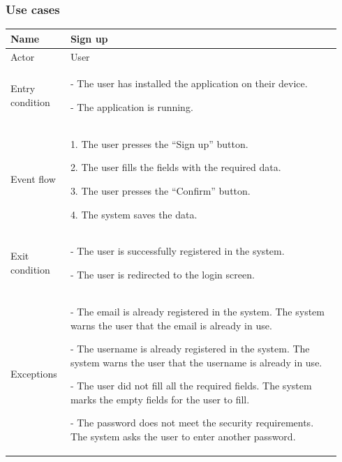 \subsubsection{Use cases}

\begin{table}[H]
\begin{tabular}{|p{0.17\linewidth}|p{0.77\linewidth}|}
\hline
Name            & Sign up
\\ \hline

Actor           & User
\\ \hline

Entry condition &
- The user has installed the application on their device.

- The application is running.
\\ \hline
Event flow      & 
    1. The user presses the “Sign up” button.

    2. The user fills the fields with the required data.

    3. The user presses the “Confirm” button.

    4. The system saves the data.
\\ \hline
Exit condition  & 
 - The user is successfully registered in the system.

 - The user is redirected to the login screen.
\\ \hline
Exceptions      &
    - The email is already registered in the system. The system warns the user that the email is already in use.

    - The username is already registered in the system. The system warns the user that the username is already in use.

    - The user did not fill all the required fields. The system marks the empty fields for the user to fill.

    - The password does not meet the security requirements. The system asks the user to enter another password.
\\ \hline
\end{tabular}
\end{table}

